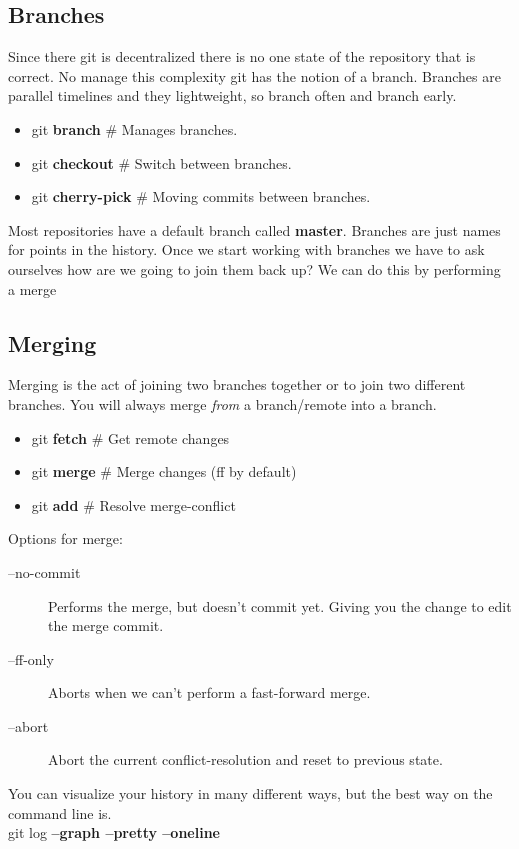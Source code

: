 \documentclass{beamer}
\begin{document}
\subsection{Branches}
\begin{frame}[fragile]
  Since there git is decentralized there is no one state of the repository that is correct. No manage this complexity git has the notion of a branch. Branches are parallel timelines and they lightweight, so branch often and branch early.
  \begin{block}{}
    \begin{itemize}
      \item git \textbf{branch}   # Manages branches. 
      \item git \textbf{checkout} # Switch between branches.
      \item git \textbf{cherry-pick} # Moving commits between branches.
    \end{itemize}
  \end{block}
  Most repositories have a default branch called \textbf{master}. Branches are just names for points in the history.
  Once we start working with branches we have to ask ourselves how are we going to join them back up? We can do this by performing a merge
\end{frame}
\subsection{Merging}
Merging is the act of joining two branches together or to join two different branches. You will always merge \emph{from} a branch/remote into a branch.
\begin{frame}[fragile]
  \begin{block}{}
    \begin{itemize}
      \item git \textbf{fetch} # Get remote changes
      \item git \textbf{merge} # Merge changes (ff by default)
      \item git \textbf{add}   # Resolve merge-conflict
    \end{itemize}

    Options for merge:
    \begin{description}
      \item[--no-commit] Performs the merge, but doesn't commit yet. Giving you the change to edit the merge commit.
      \item[--ff-only]   Aborts when we can't perform a fast-forward merge.
      \item[--abort]     Abort the current conflict-resolution and reset to previous state.
    \end{description}
  \end{block}

  You can visualize your history in many different ways, but the best way on the command line is.\\
  git log \textbf{--graph --pretty --oneline}
\end{frame}
\end{document}
